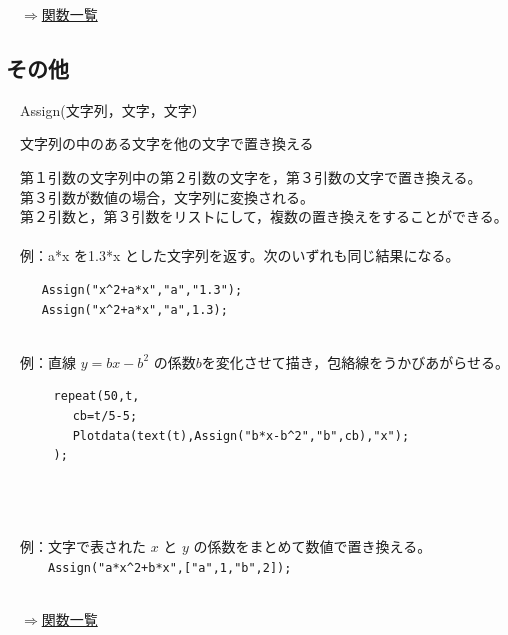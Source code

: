 \documentclass[papersize,a4paper,12pt,uplatex]{jsarticle}
\begin{document}
\begin{flushright}　\hyperlink{functionlist}{$\Rightarrow$関数一覧}\end{flushright}
\newpage

\subsection{その他}
\begin{description}

\hypertarget{assign}{}
\item[関数]　Assign(文字列，文字，文字）
\item[機能]　文字列の中のある文字を他の文字で置き換える
\item[説明]　第１引数の文字列中の第２引数の文字を，第３引数の文字で置き換える。\\
　第３引数が数値の場合，文字列に変換される。\\
　第２引数と，第３引数をリストにして，複数の置き換えをすることができる。\\
　\\
　例：a*x を1.3*x とした文字列を返す。次のいずれも同じ結果になる。
\begin{verbatim}
　　　Assign("x^2+a*x","a","1.3"); 
　　　Assign("x^2+a*x","a",1.3);
\end{verbatim}
　\\
　例：直線 $y=bx-b^2$ の係数$b$を変化させて描き，包絡線をうかびあがらせる。
\begin{verbatim}
　　　　repeat(50,t,
 　　　　　cb=t/5-5;
 　　　　　Plotdata(text(t),Assign("b*x-b^2","b",cb),"x");
　　　　);
\end{verbatim}
 　\\
　　　　　\\
　\\
　例：文字で表された $x$ と $y$ の係数をまとめて数値で置き換える。\\
　　　\verb|Assign("a*x^2+b*x",["a",1,"b",2]);|\\
　\\
\begin{flushright}　\hyperlink{functionlist}{$\Rightarrow$関数一覧}\end{flushright}


\end{description}
\end{document}
